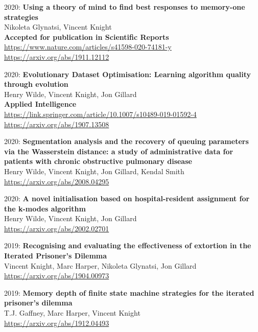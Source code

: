 \documentclass[10pt]{res} %
\begin{document}
\begin{resume}
\begin{etaremune}
\item
2020: \textbf{Using a theory of mind to find best responses to memory-one strategies}\\
Nikoleta Glynatsi, Vincent Knight
\\
\textbf{Accepted for publication in Scientific Reports}
\\
\url{https://www.nature.com/articles/s41598-020-74181-y}
\\
\url{https://arxiv.org/abs/1911.12112}
\\

\item
2020: \textbf{Evolutionary Dataset Optimisation: Learning algorithm quality through evolution}\\
Henry Wilde, Vincent Knight, Jon Gillard
\\
\textbf{Applied Intelligence}
\\
\url{https://link.springer.com/article/10.1007/s10489-019-01592-4}
\\
\url{https://arxiv.org/abs/1907.13508}
\\

\item
2020: \textbf{Segmentation analysis and the recovery of queuing parameters via the Wasserstein distance: a study of administrative data for patients with chronic obstructive pulmonary disease}\\
Henry Wilde, Vincent Knight, Jon Gillard, Kendal Smith
\\
\url{https://arxiv.org/abs/2008.04295}
\\

\item
2020: \textbf{A novel initialisation based on hospital-resident assignment for the k-modes algorithm}\\
Henry Wilde, Vincent Knight, Jon Gillard
\\
\url{https://arxiv.org/abs/2002.02701}
\\

\item
2019: \textbf{Recognising and evaluating the effectiveness of extortion in the Iterated Prisoner's Dilemma}\\
Vincent Knight, Marc Harper, Nikoleta Glynatsi, Jon Gillard
\\
\url{https://arxiv.org/abs/1904.00973}
\\

\item
2019: \textbf{Memory depth of finite state machine strategies for the iterated prisoner's dilemma}\\
T.J. Gaffney, Marc Harper, Vincent Knight
\\
\url{https://arxiv.org/abs/1912.04493}
\\


\end{etaremune}
\end{resume}
\end{document}
